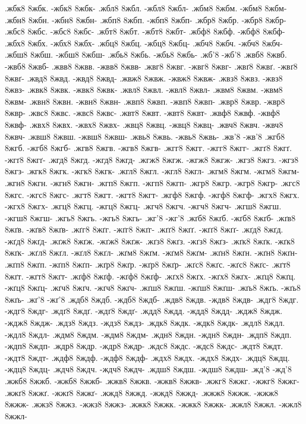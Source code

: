 {.жбк8 8жбк. -жбк8 8жбк-
.жбл8 8жбл. -жбл8 8жбл-
.жбм8 8жбм. -жбм8 8жбм-
.жбн8 8жбн. -жбн8 8жбн-
.жбп8 8жбп. -жбп8 8жбп-
.жбр8 8жбр. -жбр8 8жбр-
.жбс8 8жбс. -жбс8 8жбс-
.жбт8 8жбт. -жбт8 8жбт-
.жбф8 8жбф. -жбф8 8жбф-
.жбх8 8жбх. -жбх8 8жбх-
.жбц8 8жбц. -жбц8 8жбц-
.жбч8 8жбч. -жбч8 8жбч-
.жбш8 8жбш. -жбш8 8жбш-
.жбь8 8жбь. -жбь8 8жбь-
.жб'8 -жб'8
.жвб8 8жвб. -жвб8 8жвб-
.жвв8 8жвв. -жвв8 8жвв-
.жвг8 8жвг. -жвг8 8жвг-
.жвґ8 8жвґ. -жвґ8 8жвґ-
.жвд8 8жвд. -жвд8 8жвд-
.жвж8 8жвж. -жвж8 8жвж-
.жвз8 8жвз. -жвз8 8жвз-
.жвк8 8жвк. -жвк8 8жвк-
.жвл8 8жвл. -жвл8 8жвл-
.жвм8 8жвм. -жвм8 8жвм-
.жвн8 8жвн. -жвн8 8жвн-
.жвп8 8жвп. -жвп8 8жвп-
.жвр8 8жвр. -жвр8 8жвр-
.жвс8 8жвс. -жвс8 8жвс-
.жвт8 8жвт. -жвт8 8жвт-
.жвф8 8жвф. -жвф8 8жвф-
.жвх8 8жвх. -жвх8 8жвх-
.жвц8 8жвц. -жвц8 8жвц-
.жвч8 8жвч. -жвч8 8жвч-
.жвш8 8жвш. -жвш8 8жвш-
.жвь8 8жвь. -жвь8 8жвь-
.жв'8 -жв'8
.жгб8 8жгб. -жгб8 8жгб-
.жгв8 8жгв. -жгв8 8жгв-
.жгг8 8жгг. -жгг8 8жгг-
.жгґ8 8жгґ. -жгґ8 8жгґ-
.жгд8 8жгд. -жгд8 8жгд-
.жгж8 8жгж. -жгж8 8жгж-
.жгз8 8жгз. -жгз8 8жгз-
.жгк8 8жгк. -жгк8 8жгк-
.жгл8 8жгл. -жгл8 8жгл-
.жгм8 8жгм. -жгм8 8жгм-
.жгн8 8жгн. -жгн8 8жгн-
.жгп8 8жгп. -жгп8 8жгп-
.жгр8 8жгр. -жгр8 8жгр-
.жгс8 8жгс. -жгс8 8жгс-
.жгт8 8жгт. -жгт8 8жгт-
.жгф8 8жгф. -жгф8 8жгф-
.жгх8 8жгх. -жгх8 8жгх-
.жгц8 8жгц. -жгц8 8жгц-
.жгч8 8жгч. -жгч8 8жгч-
.жгш8 8жгш. -жгш8 8жгш-
.жгь8 8жгь. -жгь8 8жгь-
.жг'8 -жг'8
.жґб8 8жґб. -жґб8 8жґб-
.жґв8 8жґв. -жґв8 8жґв-
.жґг8 8жґг. -жґг8 8жґг-
.жґґ8 8жґґ. -жґґ8 8жґґ-
.жґд8 8жґд. -жґд8 8жґд-
.жґж8 8жґж. -жґж8 8жґж-
.жґз8 8жґз. -жґз8 8жґз-
.жґк8 8жґк. -жґк8 8жґк-
.жґл8 8жґл. -жґл8 8жґл-
.жґм8 8жґм. -жґм8 8жґм-
.жґн8 8жґн. -жґн8 8жґн-
.жґп8 8жґп. -жґп8 8жґп-
.жґр8 8жґр. -жґр8 8жґр-
.жґс8 8жґс. -жґс8 8жґс-
.жґт8 8жґт. -жґт8 8жґт-
.жґф8 8жґф. -жґф8 8жґф-
.жґх8 8жґх. -жґх8 8жґх-
.жґц8 8жґц. -жґц8 8жґц-
.жґч8 8жґч. -жґч8 8жґч-
.жґш8 8жґш. -жґш8 8жґш-
.жґь8 8жґь. -жґь8 8жґь-
.жґ'8 -жґ'8
.ждб8 8ждб. -ждб8 8ждб-
.ждв8 8ждв. -ждв8 8ждв-
.ждг8 8ждг. -ждг8 8ждг-
.ждґ8 8ждґ. -ждґ8 8ждґ-
.ждд8 8ждд. -ждд8 8ждд-
.ждж8 8ждж. -ждж8 8ждж-
.ждз8 8ждз. -ждз8 8ждз-
.ждк8 8ждк. -ждк8 8ждк-
.ждл8 8ждл. -ждл8 8ждл-
.ждм8 8ждм. -ждм8 8ждм-
.ждн8 8ждн. -ждн8 8ждн-
.ждп8 8ждп. -ждп8 8ждп-
.ждр8 8ждр. -ждр8 8ждр-
.ждс8 8ждс. -ждс8 8ждс-
.ждт8 8ждт. -ждт8 8ждт-
.ждф8 8ждф. -ждф8 8ждф-
.ждх8 8ждх. -ждх8 8ждх-
.ждц8 8ждц. -ждц8 8ждц-
.ждч8 8ждч. -ждч8 8ждч-
.ждш8 8ждш. -ждш8 8ждш-
.жд'8 -жд'8
.жжб8 8жжб. -жжб8 8жжб-
.жжв8 8жжв. -жжв8 8жжв-
.жжг8 8жжг. -жжг8 8жжг-
.жжґ8 8жжґ. -жжґ8 8жжґ-
.жжд8 8жжд. -жжд8 8жжд-
.жжж8 8жжж. -жжж8 8жжж-
.жжз8 8жжз. -жжз8 8жжз-
.жжк8 8жжк. -жжк8 8жжк-
.жжл8 8жжл. -жжл8 8жжл-
}
